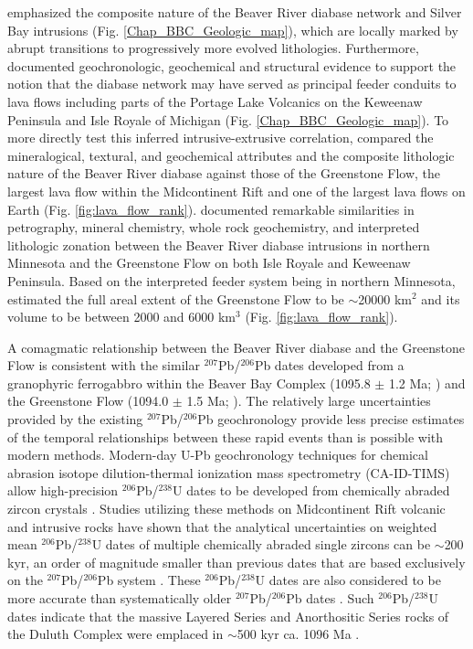 \cite{Miller1997a} emphasized the composite nature of the Beaver River diabase network and Silver Bay intrusions (Fig. \ref{Chap_BBC_Geologic_map}), which are locally marked by abrupt transitions to progressively more evolved lithologies. Furthermore, \cite{Miller1997a} documented geochronologic, geochemical and structural evidence to support the notion that the diabase network may have served as principal feeder conduits to lava flows including parts of the Portage Lake Volcanics on the Keweenaw Peninsula and Isle Royale of Michigan (Fig. \ref{Chap_BBC_Geologic_map}). To more directly test this inferred intrusive-extrusive correlation, \cite{Doyle2016a} compared the mineralogical, textural, and geochemical attributes and the composite lithologic nature of the Beaver River diabase against those of the Greenstone Flow, the largest lava flow within the Midcontinent Rift and one of the largest lava flows on Earth (Fig. \ref{fig:lava_flow_rank}). \cite{Doyle2016a} documented remarkable similarities in petrography, mineral chemistry, whole rock geochemistry, and interpreted lithologic zonation between the Beaver River diabase intrusions in northern Minnesota and the Greenstone Flow on both Isle Royale and Keweenaw Peninsula. Based on the interpreted feeder system being in northern Minnesota, \cite{Doyle2016a} estimated the full areal extent of the Greenstone Flow to be $\sim$20000 km$^2$ and its volume to be between 2000 and 6000 km$^3$ (Fig. \ref{fig:lava_flow_rank}). 

A comagmatic relationship between the Beaver River diabase and the Greenstone Flow is consistent with the similar $^{207}$Pb/$^{206}$Pb dates developed from a granophyric ferrogabbro within the Beaver Bay Complex (1095.8 $\pm$ 1.2 Ma; \citealp{Paces1993a}) and the Greenstone Flow (1094.0 $\pm$ 1.5 Ma; \citealp{Davis1990a}). The relatively large uncertainties provided by the existing $^{207}$Pb/$^{206}$Pb geochronology provide less precise estimates of the temporal relationships between these rapid events than is possible with modern methods. Modern-day U-Pb geochronology techniques for chemical abrasion isotope dilution-thermal ionization mass spectrometry (CA-ID-TIMS) allow high-precision $^{206}$Pb/$^{238}$U dates to be developed from chemically abraded zircon crystals \citep{Mattinson2005a}. Studies utilizing these methods on Midcontinent Rift volcanic and intrusive rocks have shown that the analytical uncertainties on weighted mean $^{206}$Pb/$^{238}$U dates of multiple chemically abraded single zircons can be $\sim$200 kyr, an order of magnitude smaller than previous dates that are based exclusively on the $^{207}$Pb/$^{206}$Pb system \citep{Fairchild2017a, Swanson-Hysell2019a, Swanson-Hysell2021a}. These $^{206}$Pb/$^{238}$U dates are also considered to be more accurate than systematically older $^{207}$Pb/$^{206}$Pb dates \citep{Schoene2006a}. Such $^{206}$Pb/$^{238}$U dates indicate that the massive Layered Series and Anorthositic Series rocks of the Duluth Complex were emplaced in $\sim$500 kyr ca. 1096 Ma \citep{Swanson-Hysell2021a}.  

